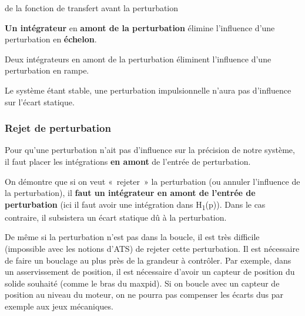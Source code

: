 \begin{longtable}[]
{de la fonction de transfert avant la perturbation} \\
\end{longtable}

\textbf{Un intégrateur} en \textbf{amont de la perturbation} élimine l'influence d'une perturbation en \textbf{échelon}.

Deux intégrateurs en amont de la perturbation éliminent l'influence d'une perturbation en rampe.

Le système étant stable, une perturbation impulsionnelle n'aura pas d'influence sur l'écart statique.

\hypertarget{mod-rejet-de-perturbation}{%
\subsubsection{Rejet de perturbation}\label{mod-rejet-de-perturbation}}

Pour qu'une perturbation n'ait pas d'influence sur la précision de notre système, il faut placer les intégrations \textbf{en amont} de l'entrée de perturbation.

On démontre que si on veut «~rejeter~» la perturbation (ou annuler l'influence de la perturbation), il \textbf{faut un intégrateur en amont de l'entrée de perturbation} (ici il faut avoir une intégration dans H\textsubscript{1}(p)). Dans le cas contraire, il subsistera un écart statique dû à la perturbation.

De même si la perturbation n'est pas dans la boucle, il est très difficile (impossible avec les notions d'ATS) de rejeter cette perturbation. Il est nécessaire de faire un bouclage au plus près de la grandeur à contrôler. Par exemple, dans un asservissement de position, il est nécessaire d'avoir un capteur de position du solide souhaité (comme le bras du maxpid). Si on boucle avec un capteur de position au niveau du moteur, on ne pourra pas compenser les écarts dus par exemple aux jeux mécaniques.

